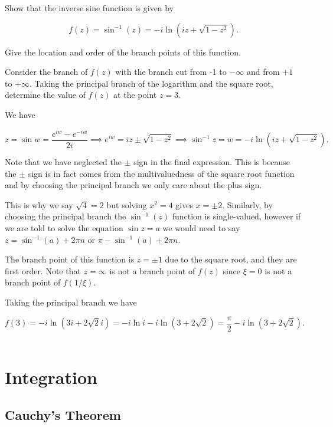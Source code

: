 \documentclass[english,a4paper,12pt]{report}
\begin{document}
{Show that the inverse sine function is given by 

\begin{equation}
    f(z) = \sin ^{-1} (z) = -i \ln (iz + \sqrt{1-z^2}). 
\end{equation}

Give the location and order of the branch points of this function.

Consider the branch of \(f(z)\) with the branch cut from -1 to \(-\infty\) and from \(+1\) to \(+\infty\). Taking the principal branch of the logarithm and the square root, determine the value of \(f(z)\) at the point \(z = 3\).       
}
{We have

\begin{equation}
    z = \sin w = \frac{e^{iw}-e^{-iw}  }{2i} \implies e^{iw} = iz \pm \sqrt{1-z^2} \implies \sin ^{-1} z = w = -i \ln (iz + \sqrt{1-z^2} ). \label{sin}  
\end{equation}

Note that we have neglected the \(\pm \) sign in the final expression. This is because the \(\pm \) sign is in fact comes from the multivaluedness of the square root function and by choosing the principal branch we only care about the plus sign. 

This is why we say \(\sqrt{4} =2 \) but solving \(x^2=4\) gives \(x = \pm 2\). Similarly, by choosing the principal branch the \(\sin ^{-1} (z)\) function is single-valued, however if we are told to solve the equation \(\sin z = a\) we would need to say \(z = \sin ^{-1} (a) + 2\pi n \text { or } \pi -\sin ^{-1} (a) + 2\pi n\).   

The branch point of this function is \(z = \pm 1\) due to the square root, and they are first order. Note that \(z = \infty\) is not a branch point of \(f(z)\) since \(\xi = 0\) is not a branch point of \(f(1 /\xi )\).

Taking the principal branch we have 

\begin{equation}
    f(3) = -i \ln (3i +2\sqrt{2}i ) = -i \ln i - i \ln (3+2\sqrt{2} ) = \frac{\pi }{2} - i \ln (3+2 \sqrt{2} ). 
\end{equation}
~
} 



\section{Integration}

\subsection{Cauchy's Theorem}
\end{document}
